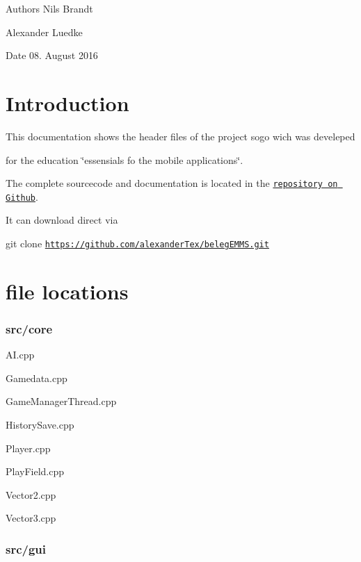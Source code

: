 \begin{DoxyAuthor}{Authors}
Nils Brandt 

Alexander Luedke
\end{DoxyAuthor}
\begin{DoxyDate}{Date}
08. August 2016
\end{DoxyDate}
\hypertarget{index_Introduction}{}\section{Introduction}\label{index_Introduction}
This documentation shows the header files of the project sogo wich was develeped\par
 for the education \char`\"{}essensials fo the mobile applications\char`\"{}. 

The complete sourcecode and documentation is located in the \href{https://github.com/alexanderTex/belegEMMS}{\tt repository on Github}. \par
 It can download direct via \par
 git clone \href{https://github.com/alexanderTex/belegEMMS.git}{\tt https\-://github.\-com/alexander\-Tex/beleg\-E\-M\-M\-S.\-git}





\section*{file locations}

\subsubsection*{src/core}


\begin{DoxyItemize}
\item A\-I.\-cpp
\item Gamedata.\-cpp
\item Game\-Manager\-Thread.\-cpp
\item History\-Save.\-cpp
\item Player.\-cpp
\item Play\-Field.\-cpp
\item Vector2.\-cpp
\item Vector3.\-cpp
\end{DoxyItemize}

\subsubsection*{src/gui}


